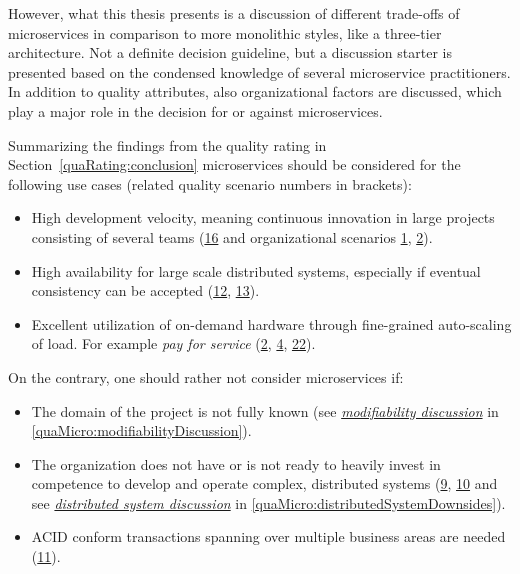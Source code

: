 However, what this thesis presents is a discussion of different trade-offs of microservices in comparison to more monolithic styles, like a three-tier architecture.
Not a definite decision guideline, but a discussion starter is presented based on the condensed knowledge of several microservice practitioners.
In addition to quality attributes, also organizational factors are discussed, which play a major role in the decision for or against microservices.

Summarizing the findings from the quality rating in Section~\ref{quaRating:conclusion} microservices should be considered for the following use cases (related quality scenario numbers in brackets):

\begin{itemize}
\item High development velocity, meaning continuous innovation in large projects consisting of several teams (\hyperref[quaMicro:s16]{16} and organizational scenarios \hyperref[quaMicro:so1]{1}, \hyperref[quaMicro:so2]{2}).
\item High availability for large scale distributed systems, especially if eventual consistency can be accepted (\hyperref[quaMicro:s12]{12}, \hyperref[quaMicro:s13]{13}).
\item Excellent utilization of on-demand hardware through fine-grained auto-scaling of load. For example \textit{pay for service} (\hyperref[quaMicro:s2]{2}, \hyperref[quaMicro:s4]{4}, \hyperref[quaMicro:s22]{22}). 
\end{itemize}

On the contrary, one should rather not consider microservices if:

\begin{itemize}
\item The domain of the project is not fully known (see \textit{\hyperref[quaMicro:modifiabilityDiscussion]{modifiability discussion}} in \ref{quaMicro:modifiabilityDiscussion}).
\item The organization does not have or is not ready to heavily invest in competence to develop and operate complex, distributed systems (\hyperref[quaMicro:s9]{9}, \hyperref[quaMicro:s10]{10} and see \textit{\hyperref[quaMicro:distributedSystemDownsides]{distributed system discussion}} in \ref{quaMicro:distributedSystemDownsides}).
\item ACID conform transactions spanning over multiple business areas are needed (\hyperref[quaMicro:s11]{11}).
\end{itemize}

